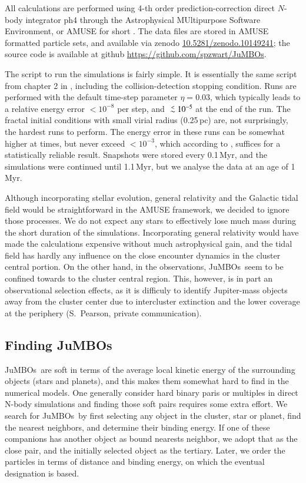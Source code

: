 \documentclass[submission,phys]{lib/SciPost}
\def\aplt{\ {\raise-.5ex\hbox{$\buildrel<\over\sim$}}\ }
\newcommand{\jumbos}{\mbox{JuMBOs}}
\begin{document}
All calculations are performed using 4-th order prediction-correction
direct $N$-body integrator {\sc ph4} \cite{2022A&A...659A..86P}
through the Astrophysical MUltipurpose Software Environment, or AMUSE
for short
\cite{2013CoPhC.183..456P,2013AA...557A..84P,2018araa.book.....P}.
The data files are stored in {\sc AMUSE} formatted particle sets, and
available via zenodo \url{10.5281/zenodo.10149241}; the source
code is available at github \url{https://github.com/spzwart/JuMBOs}.

The script to run the simulations is fairly simple.  It is essentially
the same script from chapter 2 in \cite{2018araa.book.....P},
including the collision-detection stopping condition.  Runs are
performed with the default time-step parameter $\eta=0.03$, which
typically leads to a relative energy error $<10^{-8}$ per step, and
$\aplt 10^{-5}$ at the end of the run. The fractal initial conditions
with small virial radius (0.25\,pc) are, not surprisingly, the hardest
runs to perform. The energy error in these runs can be somewhat higher
at times, but never exceed $<10^{-3}$, which according to
\cite{2041-8205-785-1-L3}, suffices for a statistically reliable
result.  Snapshots were stored every 0.1\,Myr, and the simulations
were continued until 1.1\,Myr, but we analyse the data at an age of
1\,Myr.

Although incorporating stellar evolution, general relativity and the
Galactic tidal field would be straightforward in the AMUSE framework,
we decided to ignore those processes.  We do not expect any stars to
effectively lose much mass during the short duration of the
simulations. Incorporating general relativity would have made the
calculations expensive without much astrophysical gain, and the tidal
field has hardly any influence on the close encounter dynamics in the
cluster central portion.  On the other hand, in the observations,
\jumbos\, seem to be confined towards to the cluster central region.
This, however, is in part an observational selection effects, as it is
difficuly to identify Jupiter-mass objects away from the cluster
center due to intercluster extinction and the lower coverage at the
periphery (S.\, Pearson, private communication).

\subsection{Finding \jumbos}

\jumbos\, are soft in terms of the average local kinetic energy of the
surrounding objects (stars and planets), and this makes them somewhat
hard to find in the numerical models.  One generally consider hard
binary paris or multiples in direct N-body simulations and finding
those soft pairs requires some extra effort.  We search for \jumbos\,
by first selecting any object in the cluster, star or planet, find
the nearest neighbors, and determine their binding energy. If one of
these companions has another object as bound nearests neighbor, we
adopt that as the close pair, and the initially selected object as the
tertiary. Later, we order the particles in terms of distance and
binding energy, on which the eventual designation is based.
\end{document}
